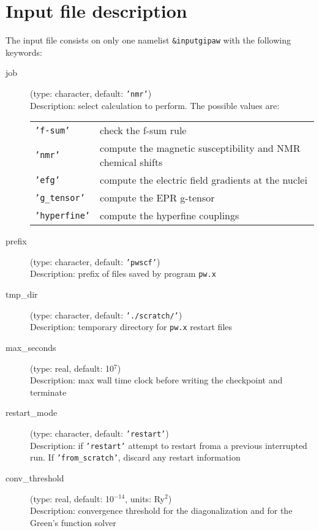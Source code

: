 \documentclass[a4paper,11pt,twoside]{article}
\begin{document}
\section{Input file description}
The input file consists on only one namelist \texttt{\&inputgipaw} with the
following keywords:
\begin{description}
\item[job] (type: character, default: \texttt{'nmr'})\\
Description: select calculation to perform. The possible values are:\\
\begin{tabular}{ll}
  \texttt{'f-sum'} & check the f-sum rule\\
  \texttt{'nmr'}   & compute the magnetic susceptibility and NMR chemical shifts\\
  \texttt{'efg'}   & compute the electric field gradients at the nuclei\\
  \texttt{'g\_tensor'}& compute the EPR g-tensor\\
  \texttt{'hyperfine'}& compute the hyperfine couplings
\end{tabular}

\item[prefix] (type: character, default: \texttt{'pwscf'})\\
Description: prefix of files saved by program \texttt{pw.x}

\item[tmp\_dir] (type: character, default: \texttt{'./scratch/'})\\
Description: temporary directory for \texttt{pw.x} restart files

\item[max\_seconds] (type: real, default: 10$^7$)\\
Description: max wall time clock before writing the checkpoint and terminate

\item[restart\_mode] (type: character, default: \texttt{'restart'})\\
Description: if \texttt{'restart'} attempt to restart froma a previous
interrupted run. If \texttt{'from\_scratch'}, discard any restart information

\item[conv\_threshold] (type: real, default: 10$^{-14}$, units: Ry$^2$)\\
Description: convergence threshold for the diagonalization and for the Green's function solver


\end{description}
\end{document}
